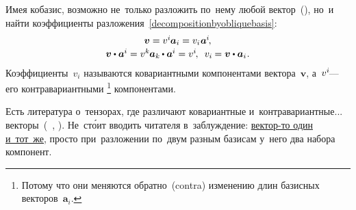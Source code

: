 \begin{otherlanguage}{russian}
\begin{tcolorbox}
\par\end{tcolorbox}

Имея кобазис, возможно не~только разложить по~нему любой вектор~(), но~и найти коэффициенты разложения~\eqref{decompositionbyobliquebasis}:
\begin{equation}\begin{array}{c}
\bm{v} = v^{i} \hspace{-0.1ex} \bm{a}_i = v_{i} \hspace{.1ex} \bm{a}^{\hspace{-0.05ex}i} \hspace{-0.25ex},
\\[.16em]
\bm{v} \dotp \bm{a}^{\hspace{-0.05ex}i} = v^{k} \hspace{-0.1ex} \bm{a}_k \hspace{-0.1ex} \dotp \bm{a}^{\hspace{-0.05ex}i} = v^{i} \hspace{-0.25ex}, \:\;
v_{i} \hspace{-0.1ex} = \bm{v} \dotp \bm{a}_i \hspace{.1ex} .
\end{array}\end{equation}
\noindent
Коэффициенты~${v_i}$ называются ко\-вариант\-ными компонентами вектора~$\bm{v}$, а~${v^i \hspace{-0.25ex}}$\:--- его контра\-вариант\-ными%
\footnote{Потому что они меняются обратно~(contra) изменению длин базисных векторов~${\bm{a}_i}$.}\hspace{-0.2ex}
компонентами.

Есть литература о~тензорах, где различают ко\-вариант\-ные и~контра\-вариант\-ные... векторы~(~, ).
Не~ст\'{о}ит вводить читателя в~заблуждение: \href{https://www.physicsforums.com/threads/is-a-vector-itself-contra-covariant-or-just-its-components.994318/}{вектор\hbox{-}то один и~тот~же}, просто при~разложении по~двум разным базисам у~него два набора компонент.




\end{otherlanguage}
